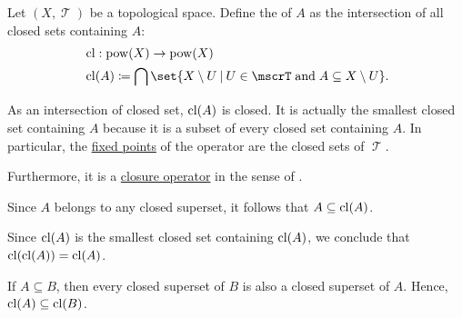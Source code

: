 \begin{definition}\label{def:topological_closure_operator}
  Let \( (X, \mscrT) \) be a topological space. Define the  of \( A \) as the intersection of all closed sets containing \( A \):
  \begin{equation*}
    \begin{aligned}
      &\cl: \pow(X) \to \pow(X) \\
      &\cl(A) \coloneqq \bigcap \set{ X \setminus U \given U \in \mscrT \T{and} A \subseteq X \setminus U }.
    \end{aligned}
  \end{equation*}

  As an intersection of closed set, \( \operatorname{cl}(A) \) is closed. It is actually the smallest closed set containing \( A \) because it is a subset of every closed set containing \( A \). In particular, the \hyperref[def:fixed_point]{fixed points} of the operator are the closed sets of \( \mscrT \).

  Furthermore, it is a \hyperref[def:closure_operator]{closure operator} in the sense of .
\end{definition}
\begin{defproof}
   Since \( A \) belongs to any closed superset, it follows that \( A \subseteq \operatorname{cl}(A) \).

   Since \( \operatorname{cl}(A) \) is the smallest closed set containing \( \operatorname{cl}(A) \), we conclude that \( \operatorname{cl}(\operatorname{cl}(A)) = \operatorname{cl}(A) \).

   If \( A \subseteq B \), then every closed superset of \( B \) is also a closed superset of \( A \). Hence, \( \operatorname{cl}(A) \subseteq \operatorname{cl}(B) \).
\end{defproof}

